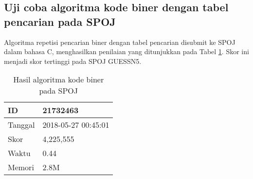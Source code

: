 \subsection{Uji coba algoritma kode biner dengan tabel pencarian pada SPOJ}

Algoritma repetisi pencarian biner dengan tabel pencarian disubmit ke SPOJ dalam bahasa C, menghasilkan penilaian yang ditunjukkan pada Tabel \ref{tab:score_binary_code}. Skor ini menjadi skor tertinggi pada SPOJ GUESSN5.

\begin{table}[h!]
\caption{Hasil algoritma kode biner pada SPOJ}
\label{tab:score_binary_code}
\begin{center}
\begin{tabular} {|l|l|}
\hline
ID & 21732463 \\ \hline
Tanggal & 2018-05-27 00:45:01 \\ \hline
Skor & 4,225,555 \\ \hline
Waktu & 0.44 \\ \hline
Memori & 2.8M \\ \hline
\end{tabular}
\end{center}
\end{table}
